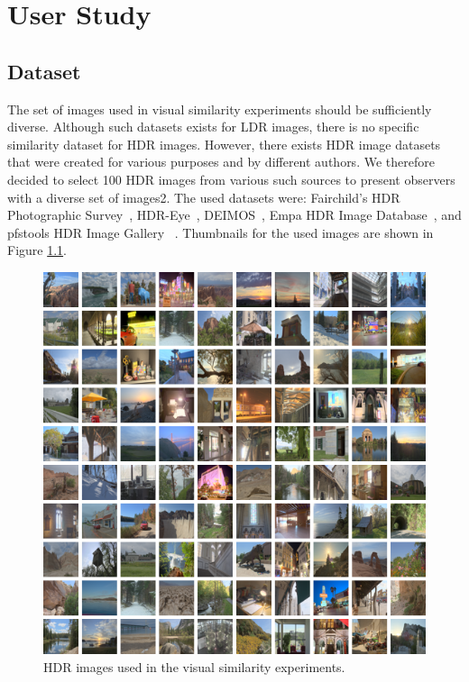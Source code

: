 \chapter{User Study}
\label{chp:b3}

\section{Dataset}

The set of images used in visual similarity experiments should be sufficiently diverse. Although such datasets exists for LDR images, there is no specific similarity dataset for HDR images. However, there exists HDR image datasets that were created for various purposes and by different authors. We therefore decided to select 100 HDR images from various such sources to present observers with a diverse set of images2. The used datasets were: Fairchild’s HDR Photographic Survey~\cite{fairchild2007hdr}, HDR-Eye~\cite{nemoto2015visual}, DEIMOS~\cite{klima2011deimos}, Empa HDR Image Database~\cite{EmpaHDR}, and pfstools HDR Image Gallery ~\cite{mantiuk2007high}. Thumbnails for the used images are shown in Figure \ref{fig:dataset}.

\begin{figure}
\begin{center}
\includegraphics[width=\textwidth]{figures/chapter3/dataset.png}
\caption{HDR images used in the visual similarity experiments.}
\label{fig:dataset}
\end{center}
\end{figure}


